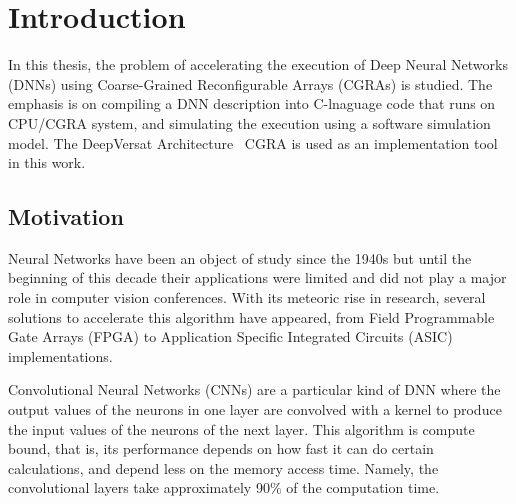 
\chapter{Introduction}
\label{chapter:introduction}




In this thesis, the problem of accelerating the execution of Deep Neural
Networks (DNNs) using Coarse-Grained Reconfigurable Arrays (CGRAs) is studied.
The emphasis is on compiling a DNN description into C-lnaguage code that runs on
CPU/CGRA system, and simulating the execution using a software simulation model.
The DeepVersat Architecture~\cite{valter:deepversat} CGRA is used as an
implementation tool in this work.


\section{Motivation}
\label{section:motivation}

Neural Networks have been an object of study since the 1940s but until the
beginning of this decade their applications were limited and did not play a
major role in computer vision conferences. With its meteoric rise in research,
several solutions to accelerate this algorithm have appeared, from Field Programmable Gate Arrays (FPGA) to
Application Specific Integrated Circuits (ASIC) implementations.

Convolutional Neural Networks (CNNs) are a particular kind of DNN where the output
values of the neurons in one layer are convolved with a kernel to produce the
input values of the neurons of the next layer. This algorithm is compute bound,
that is, its performance depends on how fast it can do certain calculations, and
depend less on the memory access time. Namely, the convolutional layers take
approximately 90$\%$ of the computation time.

